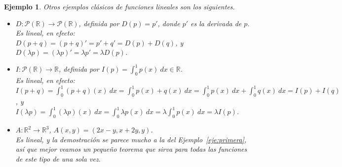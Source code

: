 \documentclass[12pt]{book}
\newtheorem{ejem}{Ejemplo}
\def\R{\mathbb{R}}
\def\P{\mathcal{P}}
\begin{document}
\bigskip


\begin{ejem}{
Otros ejemplos clásicos de funciones lineales son los siguientes.
\begin{itemize}
\item $D:\P(\R)\rightarrow\P(\R)$, definida por $D(p)=p'$, donde $p'$ es la \emph{derivada} de $p$.\\
Es lineal, en efecto:\\
$D(p+q)=(p+q)'=p'+q'=D(p)+D(q)$, y\\
$D(\lambda p)=(\lambda p)'=\lambda p'=\lambda D(p)$.
\item $I:\P(\R)\rightarrow\R$, definida por $I(p)={\displaystyle \int_0^1 p(x)\ dx}\in\R$.\\
Es lineal, en efecto:\\
$I(p+q)=\int_0^1(p+q)(x)\ dx=\int_0^1p(x)+q(x)\ dx=\int_0^1p(x)\ dx+\int_0^1q(x)\ dx=I(p)+I(q)$, y\\
$I(\lambda p)=\int_0^1(\lambda p)(x)\ dx=\int_0^1\lambda p(x)\ dx=\lambda \int_0^1p(x)\ dx=\lambda I(p)$.
\item $A:\R^2\rightarrow\R^3$, $A(x,y)=(2x-y,x+2y,y)$.\\
Es lineal, y la demostración se parece mucho a la del Ejemplo~\ref{eje:primera}, así que mejor veamos un pequeño teorema que sirva para todas las funciones de este tipo de una sola vez.
\end{itemize}
}
\end{ejem}

\bigskip
\end{document}
